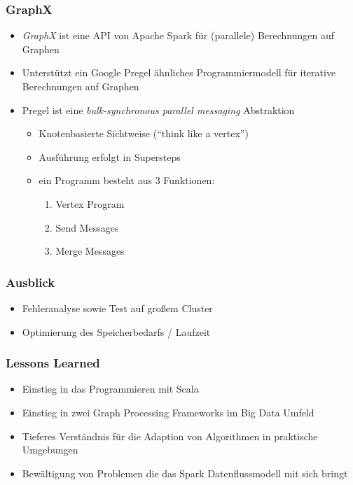 \documentclass{beamer}
\begin{document}

\begin{frame}
\frametitle{GraphX}
\begin{itemize}
\item \textit{GraphX} ist eine API von Apache Spark für (parallele) Berechnungen auf Graphen
\item Unterstützt ein Google Pregel ähnliches Programmiermodell für iterative Berechnungen auf Graphen
\item Pregel ist eine \textit{bulk-synchronous parallel messaging} Abstraktion
	\begin{itemize}
	\item Knotenbasierte Sichtweise (``think like a vertex'')
	\item Ausführung erfolgt in Supersteps
	\item ein Programm besteht aus 3 Funktionen:
		\begin{enumerate}
		\item Vertex Program
		\item Send Messages
		\item Merge Messages
		\end{enumerate}
	\end{itemize}

	
\end{itemize}
\end{frame}


\begin{frame}
\frametitle{Ausblick}
\begin{itemize}
\item Fehleranalyse sowie Test auf großem Cluster
\item Optimierung des Speicherbedarfs / Laufzeit
\end{itemize}
\end{frame}


\begin{frame}
\frametitle{Lessons Learned}
\begin{itemize}
\item Einstieg in das Programmieren mit Scala
\item Einstieg in zwei Graph Processing Frameworks im Big Data Umfeld
\item Tieferes Verständnis für die Adaption von Algorithmen in praktische Umgebungen
\item Bewältigung von Problemen die das Spark Datenflussmodell mit sich bringt
\end{itemize}
\end{frame}
\end{document}
